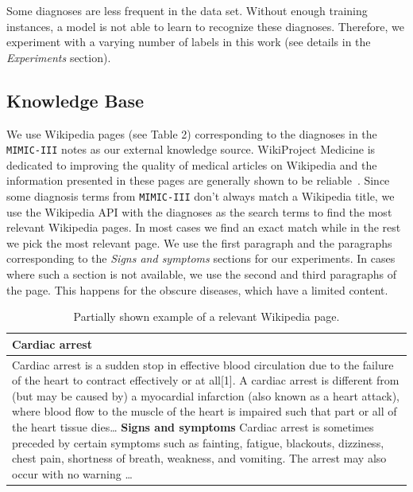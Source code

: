 Some diagnoses are less frequent in the data set. Without enough training instances, a model is not able to learn to recognize these diagnoses. Therefore, we experiment with a varying number of labels in this work (see details in the \emph{Experiments} section). %

\subsection{Knowledge Base}
We use Wikipedia pages (see Table 2) corresponding to the diagnoses in the \texttt{MIMIC-III} notes as our external knowledge source. WikiProject Medicine is dedicated to improving the quality of medical articles on Wikipedia and the information presented in these pages are generally shown to be reliable~\cite{trevena2011wikiproject}. %
Since some diagnosis terms from \texttt{MIMIC-III} don't always match a Wikipedia title, we use the Wikipedia API with the diagnoses as the search terms to find the most relevant Wikipedia pages. In most cases we find an exact match while in the rest we pick the most relevant page. We use the first paragraph and the paragraphs corresponding to the \emph{Signs and symptoms} sections for our experiments. In cases where such a section is not available, we use the second and third paragraphs of the page. This happens for the obscure diseases, which have a limited content.


\begin{table}
    \small
    \centering
\label{wiki}
    \def\arraystretch{1.5}
    \begin{tabularx}{8.5cm}{X}
    \midrule
    \textbf{Cardiac arrest} \\
    \midrule
    Cardiac arrest is a sudden stop in effective blood circulation due to the failure of the heart to contract effectively or at all[1]. A cardiac arrest is different from (but may be caused by) a myocardial infarction (also known as a heart attack), where blood flow to the muscle of the heart is impaired such that part or all of the heart tissue dies\ldots \newline
    \textbf{Signs and symptoms}\newline
    Cardiac arrest is sometimes preceded by certain symptoms such as fainting, fatigue, blackouts, dizziness, chest pain, shortness of breath, weakness, and vomiting. The arrest may also occur with no warning \ldots \\
    \midrule
    \end{tabularx}
    \caption[Data from Wikipedia]{\small Partially shown example of a relevant Wikipedia page.}
\end{table}




